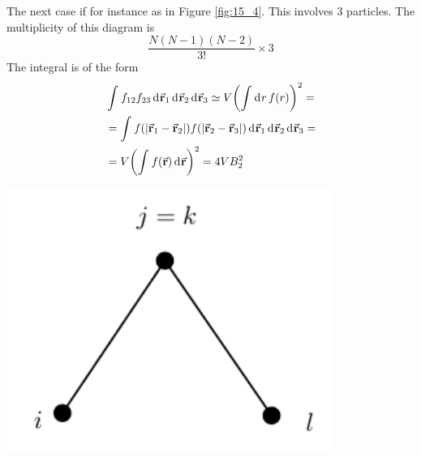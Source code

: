 \documentclass[../../Main/Main.tex]{subfiles}
\begin{document}
\begin{minipage}[c]{0.7\linewidth}
The next case if for instance as in Figure \ref{fig:15_4}. This involves 3 particles.
The multiplicity of this diagram is
\begin{equation*}
  \frac{N (N-1) (N-2)}{3!} \times 3
\end{equation*}
The integral is of the form
\begin{equation}
\begin{split}
  & \int_{}^{}  f_{12} f_{23} \dd[]{\va{r}_1}  \dd[]{\va{r}_2}   \dd[]{\va{r}_3}
  \simeq V  \qty(  \int_{}^{} \dd[]{r} f(r)  )^2  = \\
  & =   \int_{}^{}  f( \abs{\va{r}_1 - \va{r}_2} )f( \abs{\va{r}_2 - \va{r}_3} ) \dd[]{\va{r}_1}  \dd[]{\va{r}_2}  \dd[]{\va{r}_3}  = \\
  & = V \qty(\int_{}^{} f(\va{r})\dd[]{\va{r}}  )^2  = 4 V B_2^2
  \label{eq:15_3}
\end{split}
\end{equation}
\end{minipage}
\begin{minipage}[]{0.3\linewidth}
\centering
\includegraphics[width=0.8\textwidth]{./img/7__1.pdf}
\end{minipage}

\vspace{0.5cm}
\end{document}
